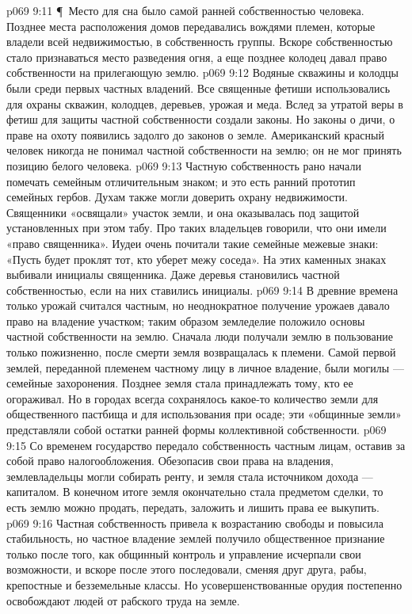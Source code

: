 \vs p069 9:11 \P\ Место для сна было самой ранней собственностью человека. Позднее места расположения домов передавались вождями племен, которые владели всей недвижимостью, в собственность группы. Вскоре собственностью стало признаваться место разведения огня, а еще позднее колодец давал право собственности на прилегающую землю.
\vs p069 9:12 Водяные скважины и колодцы были среди первых частных владений. Все священные фетиши использовались для охраны скважин, колодцев, деревьев, урожая и меда. Вслед за утратой веры в фетиш для защиты частной собственности создали законы. Но законы о дичи, о праве на охоту появились задолго до законов о земле. Американский красный человек никогда не понимал частной собственности на землю; он не мог принять позицию белого человека.
\vs p069 9:13 Частную собственность рано начали помечать семейным отличительным знаком; и это есть ранний прототип семейных гербов. Духам также могли доверить охрану недвижимости. Священники «освящали» участок земли, и она оказывалась под защитой установленных при этом табу. Про таких владельцев говорили, что они имели «право священника». Иудеи очень почитали такие семейные межевые знаки: «Пусть будет проклят тот, кто уберет межу соседа». На этих каменных знаках выбивали инициалы священника. Даже деревья становились частной собственностью, если на них ставились инициалы.
\vs p069 9:14 В древние времена только урожай считался частным, но неоднократное получение урожаев давало право на владение участком; таким образом земледелие положило основы частной собственности на землю. Сначала люди получали землю в пользование только пожизненно, после смерти земля возвращалась к племени. Самой первой землей, переданной племенем частному лицу в личное владение, были могилы --- семейные захоронения. Позднее земля стала принадлежать тому, кто ее огораживал. Но в городах всегда сохранялось какое\hyp{}то количество земли для общественного пастбища и для использования при осаде; эти «общинные земли» представляли собой остатки ранней формы коллективной собственности.
\vs p069 9:15 Со временем государство передало собственность частным лицам, оставив за собой право налогообложения. Обезопасив свои права на владения, землевладельцы могли собирать ренту, и земля стала источником дохода --- капиталом. В конечном итоге земля окончательно стала предметом сделки, то есть землю можно продать, передать, заложить и лишить права ее выкупить.
\vs p069 9:16 Частная собственность привела к возрастанию свободы и повысила стабильность, но частное владение землей получило общественное признание только после того, как общинный контроль и управление исчерпали свои возможности, и вскоре после этого последовали, сменяя друг друга, рабы, крепостные и безземельные классы. Но усовершенствованные орудия постепенно освобождают людей от рабского труда на земле.
